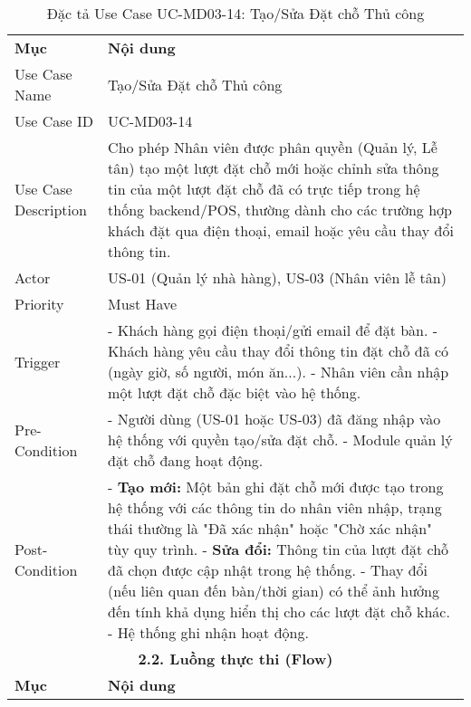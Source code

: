 \begin{longtable}{|m{4cm}|p{11cm}|}
\caption{Đặc tả Use Case UC-MD03-14: Tạo/Sửa Đặt chỗ Thủ công} \label{tab:uc_md03_14} \\
\hline

\endhead %
\hline
\endfoot %
\hline
\endlastfoot %
\multicolumn{2}{|c|}{\textbf{2.1. Tóm tắt (Summary)}} \\
\hline
\textbf{Mục} & \textbf{Nội dung} \\
\hline
Use Case Name & Tạo/Sửa Đặt chỗ Thủ công \\
\hline
Use Case ID & UC-MD03-14 \\
\hline
Use Case Description & Cho phép Nhân viên được phân quyền (Quản lý, Lễ tân) tạo một lượt đặt chỗ mới hoặc chỉnh sửa thông tin của một lượt đặt chỗ đã có trực tiếp trong hệ thống backend/POS, thường dành cho các trường hợp khách đặt qua điện thoại, email hoặc yêu cầu thay đổi thông tin. \\
\hline
Actor & US-01 (Quản lý nhà hàng), US-03 (Nhân viên lễ tân) \\
\hline
Priority & Must Have \\
\hline
Trigger & - Khách hàng gọi điện thoại/gửi email để đặt bàn. \newline - Khách hàng yêu cầu thay đổi thông tin đặt chỗ đã có (ngày giờ, số người, món ăn...). \newline - Nhân viên cần nhập một lượt đặt chỗ đặc biệt vào hệ thống. \\
\hline
Pre-Condition & - Người dùng (US-01 hoặc US-03) đã đăng nhập vào hệ thống với quyền tạo/sửa đặt chỗ. \newline - Module quản lý đặt chỗ đang hoạt động. \\
\hline
Post-Condition & - \textbf{Tạo mới:} Một bản ghi đặt chỗ mới được tạo trong hệ thống với các thông tin do nhân viên nhập, trạng thái thường là "Đã xác nhận" hoặc "Chờ xác nhận" tùy quy trình. \newline - \textbf{Sửa đổi:} Thông tin của lượt đặt chỗ đã chọn được cập nhật trong hệ thống. \newline - Thay đổi (nếu liên quan đến bàn/thời gian) có thể ảnh hưởng đến tính khả dụng hiển thị cho các lượt đặt chỗ khác. \newline - Hệ thống ghi nhận hoạt động. \\
\hline
\multicolumn{2}{|c|}{\textbf{2.2. Luồng thực thi (Flow)}} \\
\hline
\textbf{Mục} & \textbf{Nội dung} \\

\end{longtable}
